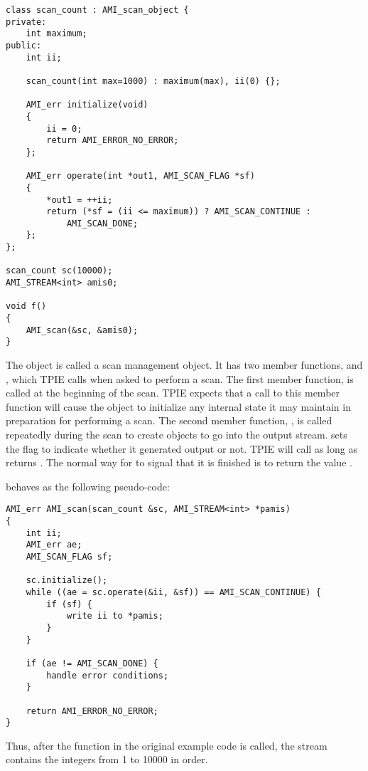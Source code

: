 \begin{verbatim}
class scan_count : AMI_scan_object {
private:
    int maximum;
public:
    int ii;

    scan_count(int max=1000) : maximum(max), ii(0) {};

    AMI_err initialize(void) 
    {
        ii = 0;
        return AMI_ERROR_NO_ERROR;
    };

    AMI_err operate(int *out1, AMI_SCAN_FLAG *sf)
    {
        *out1 = ++ii;
        return (*sf = (ii <= maximum)) ? AMI_SCAN_CONTINUE : 
            AMI_SCAN_DONE;
    };
};

scan_count sc(10000);
AMI_STREAM<int> amis0;    

void f()
{
    AMI_scan(&sc, &amis0);
}
\end{verbatim}

The object  is called a scan management
object.  It has two
member functions,  and
, which TPIE calls when asked to perform a
scan.  The first member function,  is
called at the beginning of the scan.  TPIE expects that a
call to this member function will cause the object to
initialize any internal state it may maintain in preparation
for performing a scan.  The second member function,
, is called repeatedly during the scan to
create objects to go into the output stream.
 sets the flag  to indicate
whether it generated output or not.  TPIE will call
 as long as  returns
. The normal way for
 to signal that it is finished is to
return the value . 

 behaves as the following pseudo-code:

\begin{verbatim} 
AMI_err AMI_scan(scan_count &sc, AMI_STREAM<int> *pamis)
{
    int ii;
    AMI_err ae;    
    AMI_SCAN_FLAG sf;

    sc.initialize();    
    while ((ae = sc.operate(&ii, &sf)) == AMI_SCAN_CONTINUE) {
        if (sf) {
            write ii to *pamis;
        }
    }

    if (ae != AMI_SCAN_DONE) {
        handle error conditions;
    }

    return AMI_ERROR_NO_ERROR;
}
\end{verbatim}

Thus, after the function  in the original example code is
called, the stream  contains the integers from 1 to 10000
in order.

